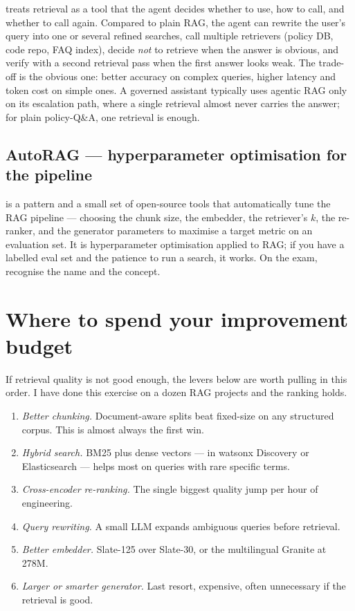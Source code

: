  treats retrieval as a tool that the agent decides whether to use, how to call, and whether to call again. Compared to plain RAG, the agent can rewrite the user's query into one or several refined searches, call multiple retrievers (policy DB, code repo, FAQ index), decide \emph{not} to retrieve when the answer is obvious, and verify with a second retrieval pass when the first answer looks weak. The trade-off is the obvious one: better accuracy on complex queries, higher latency and token cost on simple ones. A governed assistant typically uses agentic RAG only on its escalation path, where a single retrieval almost never carries the answer; for plain policy-Q\&A, one retrieval is enough.

\subsection{AutoRAG --- hyperparameter optimisation for the pipeline}

 is a pattern and a small set of open-source tools that automatically tune the RAG pipeline --- choosing the chunk size, the embedder, the retriever's $k$, the re-ranker, and the generator parameters to maximise a target metric on an evaluation set. It is hyperparameter optimisation applied to RAG; if you have a labelled eval set and the patience to run a search, it works. On the exam, recognise the name and the concept.

\section{Where to spend your improvement budget}

If retrieval quality is not good enough, the levers below are worth pulling in this order. I have done this exercise on a dozen RAG projects and the ranking holds.

\begin{enumerate}[leftmargin=*]
    \item \emph{Better chunking.} Document-aware splits beat fixed-size on any structured corpus. This is almost always the first win.
    \item \emph{Hybrid search.} BM25 plus dense vectors --- in watsonx Discovery or Elasticsearch --- helps most on queries with rare specific terms.
    \item \emph{Cross-encoder re-ranking.} The single biggest quality jump per hour of engineering.
    \item \emph{Query rewriting.} A small LLM expands ambiguous queries before retrieval.
    \item \emph{Better embedder.} Slate-125 over Slate-30, or the multilingual Granite at 278M.
    \item \emph{Larger or smarter generator.} Last resort, expensive, often unnecessary if the retrieval is good.
\end{enumerate}

